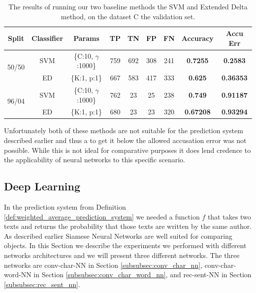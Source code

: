 \begin{table}[h]
    \centering
    \begin{tabular}{|c|c|c|c|c|c|c||c|c|}
        \hline
        Split & Classifier & Params & TP & TN & FP & FN & \textbf{Accuracy} & \textbf{Accu Err} \\ \hline
        \multirow{2}{*}{50/50} & SVM & \{C:10, $\gamma$:1000\} &  759 & 692 & 308 & 241 & \textbf{0.7255} & \textbf{0.2583} \\ \cline{2-9} 
        & ED & \{K:1, p:1\} & 667 & 583 & 417 & 333 & \textbf{0.625} & \textbf{0.36353} \\ \hline
        \multirow{2}{*}{96/04} & SVM & \{C:10, $\gamma$:1000\} & 762 & 23 & 25 & 238 & \textbf{0.749} & \textbf{0.91187} \\ \cline{2-9} 
        & ED & \{K:1, p:1\} & 680 & 23 & 23 & 320 & \textbf{0.67208} & \textbf{0.93294} \\ \hline
    \end{tabular}
    \caption{The results of running our two baseline methods the \gls{SVM} and
        Extended Delta method, on the dataset \gls{C} the validation set.}
    \label{tab:baseline-val-res}
\end{table}

Unfortunately both of these methods are not suitable for the prediction system
described earlier and thus a to get it below the allowed accusation error was
not possible. While this is not ideal for comparative purposes it does lend
credence to the applicability of neural networks to this specific scenario.


\subsection{Deep Learning}

In the prediction system from Definition
\ref{def:weighted_average_prediction_system} we needed a function $f$ that
takes two texts and returns the probability that those texts are written
by the same author. As described earlier Siamese Neural Networks are well
suited for comparing objects. In this Section we describe the experiments
we performed with different networks architectures and we will present
three different networks. The three networks are \gls{conv-char-NN} in
Section \ref{subsubsec:conv_char_nn}, \gls{conv-char-word-NN} in Section
\ref{subsubsec:conv_char_word_nn}, and \gls{rec-sent-NN} in Section
\ref{subsubsec:rec_sent_nn}.

